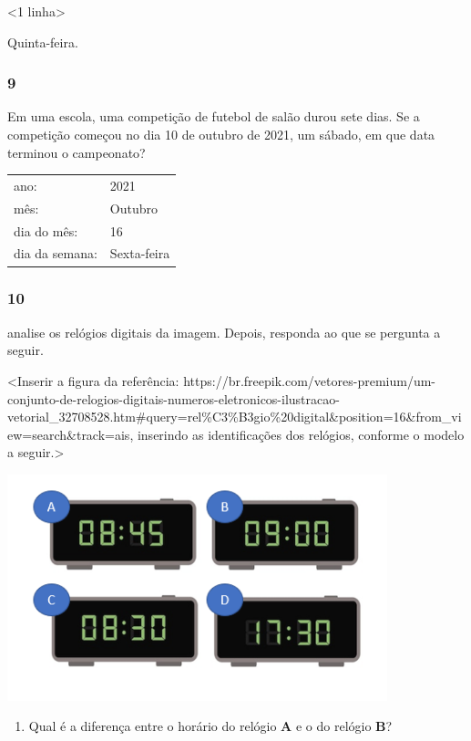 \textless{}1 linha\textgreater{}

Quinta-feira.

\subsubsection{9}\label{section-47}

Em uma escola, uma competição de futebol de salão durou sete dias.
Se a competição começou no dia 10 de outubro de 2021, um sábado, em que
data terminou o campeonato?

\begin{longtable}[]{@{}ll@{}}
\toprule
ano: & 2021\tabularnewline
mês: & Outubro\tabularnewline
dia do mês: & 16\tabularnewline
dia da semana: & Sexta-feira\tabularnewline
\bottomrule
\end{longtable}


\subsubsection{10}\label{section-48}

analise os relógios digitais da imagem. Depois, responda ao que se pergunta a seguir.

\textless{}Inserir a figura da referência:
https://br.freepik.com/vetores-premium/um-conjunto-de-relogios-digitais-numeros-eletronicos-ilustracao-vetorial\_32708528.htm\#query=rel\%C3\%B3gio\%20digital\&position=16\&from\_view=search\&track=ais,
inserindo as identificações dos relógios, conforme o modelo a
seguir.\textgreater{}

\includegraphics[width=4.34174in,height=2.58209in]{media/image38.png}

\begin{enumerate}
\def\labelenumi{\Alph{enumi})}
\item
  Qual é a diferença entre o horário do relógio \textbf{A} e o do relógio \textbf{B}?
\end{enumerate}

